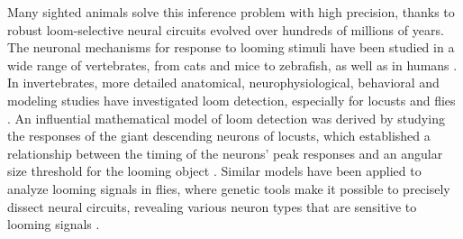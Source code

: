 \documentclass[pdftex,9pt,lineno]{elife}
\begin{document}

Many sighted animals solve this inference problem with high precision, thanks to robust loom-selective neural circuits evolved over hundreds of millions of years. The neuronal mechanisms for response to looming stimuli have been studied in a wide range of vertebrates, from cats and mice to zebrafish, as well as in humans
\citep{king1992use,hervais2015looming,ball1971infant,liu2011neuronal,salay2018midline,liu2011neuronal,shang2015parvalbumin,wu2005tectal,temizer2015visual,dunn2016neural,bhattacharyya2017visual}.
In invertebrates, more detailed anatomical, neurophysiological, behavioral and modeling studies have investigated loom detection, especially for locusts and flies \citep{oliva2014computation,sato2014role,santer2005gliding,rind1996neural,card2008visually,de2012loom,muijres2014flies,klapoetke2017ultra,von2017feature,ache2019neural}.
An influential mathematical model of loom detection was derived by studying the responses of the giant descending neurons of locusts, which established a relationship between the timing of the neurons' peak responses and an angular size threshold for the looming object \citep{gabbiani1999computation}. Similar models have been applied to analyze looming signals in  flies, where  genetic tools make it possible to precisely dissect neural circuits, revealing various neuron types that are sensitive to looming signals \citep{von2017feature,ache2019neural,morimoto2020spatial}.
\end{document}
